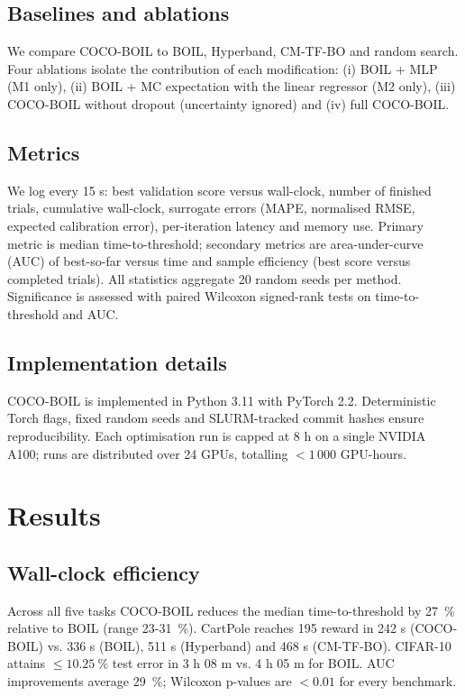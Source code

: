 \documentclass{article}
\begin{document}
\subsection{Baselines and ablations}
We compare COCO-BOIL to BOIL, Hyperband, CM-TF-BO and random search. Four ablations isolate the contribution of each modification: (i) BOIL + MLP (M1 only), (ii) BOIL + MC expectation with the linear regressor (M2 only), (iii) COCO-BOIL without dropout (uncertainty ignored) and (iv) full COCO-BOIL.

\subsection{Metrics}
We log every 15 s: best validation score versus wall-clock, number of finished trials, cumulative wall-clock, surrogate errors (MAPE, normalised RMSE, expected calibration error), per-iteration latency and memory use. Primary metric is median time-to-threshold; secondary metrics are area-under-curve (AUC) of best-so-far versus time and sample efficiency (best score versus completed trials). All statistics aggregate 20 random seeds per method. Significance is assessed with paired Wilcoxon signed-rank tests on time-to-threshold and AUC.

\subsection{Implementation details}
COCO-BOIL is implemented in Python 3.11 with PyTorch 2.2. Deterministic Torch flags, fixed random seeds and SLURM-tracked commit hashes ensure reproducibility. Each optimisation run is capped at 8 h on a single NVIDIA A100; runs are distributed over 24 GPUs, totalling $<1\,000$ GPU-hours.

\section{Results}
\subsection{Wall-clock efficiency}
Across all five tasks COCO-BOIL reduces the median time-to-threshold by 27\ \% relative to BOIL (range 23-31\ \%). CartPole reaches 195 reward in 242 s (COCO-BOIL) vs. 336 s (BOIL), 511 s (Hyperband) and 468 s (CM-TF-BO). CIFAR-10 attains $\le 10.25\ \%$ test error in 3 h 08 m vs. 4 h 05 m for BOIL. AUC improvements average 29\ \%; Wilcoxon p-values are $<0.01$ for every benchmark.
\end{document}
